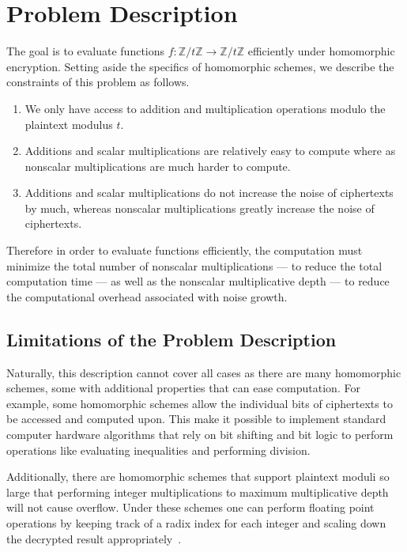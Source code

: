 \documentclass{article}
\def\zt{\mathbb{Z}/t\mathbb{Z}}
\begin{document}
    \section{Problem Description}

    The goal is to evaluate functions $f:\zt\to\zt$ efficiently under homomorphic encryption.
    Setting aside the specifics of homomorphic schemes, 
    we describe the constraints of this problem as follows.
    \begin{enumerate}[1.]
        \item
            We only have access to addition and multiplication operations modulo the plaintext modulus $t$.
        \item
            Additions and scalar multiplications are relatively easy to compute where as nonscalar multiplications are much harder to compute. 
        \item
            Additions and scalar multiplications do not increase the noise of ciphertexts by much, whereas nonscalar multiplications greatly increase the noise of ciphertexts.
    \end{enumerate}

    Therefore in order to evaluate functions efficiently, the computation must minimize
    the total number of nonscalar multiplications --- to reduce the total computation time ---
    as well as the nonscalar multiplicative depth --- to reduce the computational overhead associated with noise growth.

    \subsection{Limitations of the Problem Description}
        Naturally, this description cannot cover all cases as there are many homomorphic schemes, some with additional properties that can ease computation.
        For example, some homomorphic schemes allow the individual bits of ciphertexts to be
        accessed and computed upon.
        This make
        it possible to implement standard computer hardware algorithms that rely on bit shifting and bit logic to perform operations like evaluating inequalities and performing division.

        Additionally, there are homomorphic schemes that support plaintext moduli so large that performing integer multiplications to maximum multiplicative depth will not cause overflow.
        Under these schemes one can perform floating point operations by keeping track of a radix index for each integer and scaling down the decrypted result appropriately~\cite{newton}.
        
\end{document}
